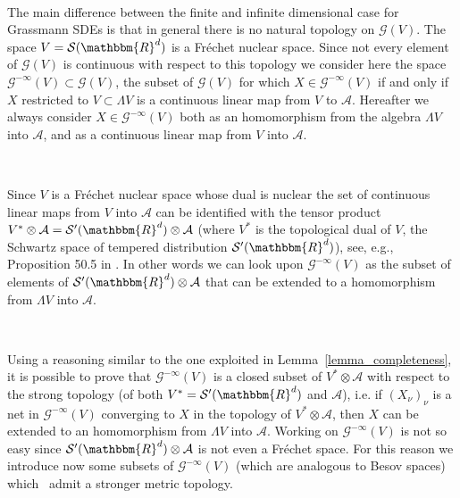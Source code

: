 \documentclass[11pt]{article}
\newcommand{\asterisk}{\mathord{*}}
\begin{document}
\

The main difference between the finite and infinite dimensional case for
Grassmann SDEs is that in general there is no natural topology on $\mathcal{G}
(V)$. The space $V = \mathcal{S} (\mathbbm{R}^d)$ is a Fr{\'e}chet nuclear
space. Since not every element of $\mathcal{G} (V)$ is continuous with respect
to this topology we consider here the space $\mathcal{G}^{- \infty} (V)
\subset \mathcal{G} (V)$, the subset of $\mathcal{G} (V)$ for which $X \in
\mathcal{G}^{- \infty} (V)$ if and only if $X$ restricted to $V \subset
\Lambda V$ is a continuous linear map from $V$ to $\mathcal{A}$. Hereafter we
always consider $X \in \mathcal{G}^{- \infty} (V)$ both as an homomorphism
from the algebra $\Lambda V$ into $\mathcal{A}$, and as a continuous linear
map from $V$ into $\mathcal{A}$.

\

Since $V$ is a Fr{\'e}chet nuclear space whose dual is nuclear the set of
continuous linear maps from $V$ into $\mathcal{A}$ can be identified with the
tensor product $V^{\asterisk} \otimes \mathcal{A} = \mathcal{S}'
(\mathbbm{R}^d) \otimes \mathcal{A}$ (where $V^{\asterisk}$ is the topological
dual of $V$, the Schwartz space of tempered distribution $\mathcal{S}'
(\mathbbm{R}^d)$), see, e.g., Proposition 50.5 in {\cite{Treves}}. In other
words we can look upon $\mathcal{G}^{- \infty} (V)$ as the subset of elements
of $\mathcal{S}' (\mathbbm{R}^d) \otimes \mathcal{A}$ that can be extended to a
homomorphism from $\Lambda V$ into $\mathcal{A}$.

\

Using a reasoning similar to the one exploited in
Lemma~\ref{lemma_completeness}, it is possible to prove that $\mathcal{G}^{-
\infty} (V)$ is a closed subset of $V^{\asterisk} \otimes \mathcal{A}$ with
respect to the strong topology (of both $V^{\asterisk} = \mathcal{S}'
(\mathbbm{R}^d)$ and $\mathcal{A}$), i.e. if $(X_{\nu})_{\nu}$ is a net in
$\mathcal{G}^{- \infty} (V)$ converging to $X$ in the topology of
$V^{\asterisk} \otimes \mathcal{A}$, then $X$ can be extended to an
homomorphism from $\Lambda V$ into $\mathcal{A}$. Working on $\mathcal{G}^{-
\infty} (V)$ is not so easy since $\mathcal{S}' (\mathbbm{R}^d) \otimes
\mathcal{A}$ is not even a Fr{\'e}chet space. For this reason we introduce now
some subsets of $\mathcal{G}^{- \infty} (V)$ (which are analogous to Besov
spaces) which \ admit a stronger metric topology.

\
\end{document}

